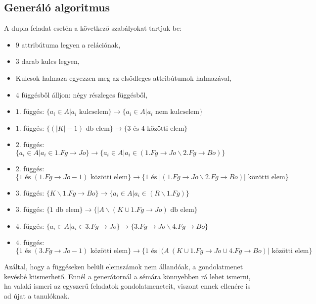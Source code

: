 \subsection{Generáló algoritmus}

A dupla feladat esetén a következő szabályokat tartjuk be:
\begin{itemize}
    \item $9$ attribútuma legyen a relációnak,
    \item $3$ darab kulcs legyen,
    \item Kulcsok halmaza egyezzen meg az elsődleges attribútumok halmazával,
    \item $4$ függésből álljon: négy részleges függésből,
    \item $1.$ függés: $\big\{ a_i \in A \big| a_i \text{ kulcselem}  \big\} \longrightarrow \big\{  a_i \in A \big| a_i \text{ nem kulcselem}  \big\}$ 
    \item $1.$ függés: $\big \{ (|K|-1) \text{ db elem} \big\} \longrightarrow \big\{ 3 \text{ és } 4 \text{ közötti elem} \big \}$
    \item $2.$ függés: $\big\{ a_i \in A \big| a_i \in 1.Fg \rightarrow Jo  \big\} \longrightarrow \big\{  a_i \in A \big| a_i \in (1.Fg \rightarrow Jo \backslash 2.Fg \rightarrow Bo)  \big\}$ 
    \item $2.$ függés: $\big \{ 1 \text{ és } (1.Fg\rightarrow Jo - 1) \text{ közötti elem} \big\} \longrightarrow \big\{ 1 \text { és } |(1.Fg \rightarrow Jo \backslash 2.Fg \rightarrow Bo)|  \text{ közötti elem} \big \}$
    \item $3.$ függés: $\big\{ K \backslash 1.Fg\rightarrow Bo \big\} \longrightarrow \big\{  a_i \in A \big| a_i \in (R \backslash 1.Fg)  \big\}$
    \item $3.$ függés: $\big \{ 1 \text{ db elem} \big\} \longrightarrow \big\{|A \backslash (K \cup 1.Fg \rightarrow Jo) \text{ db elem} \big \}$
    \item $4.$ függés: $\big\{ a_i \in A \big| a_i \in 3.Fg\rightarrow Jo \big\} \longrightarrow \big\{ 3.Fg\rightarrow Jo \backslash 4.Fg\rightarrow Bo\big\}$
    \item $4.$ függés: $\big \{ 1 \text{ és } (3.Fg\rightarrow Jo - 1) \text{ közötti elem} \big\} \longrightarrow \big\{ 1 \text { és } |(A \ (K \cup 1.Fg \rightarrow Jo \cup 4.Fg \rightarrow Bo)|  \text{ közötti elem} \big \}$
\end{itemize}

Azáltal, hogy a függéseken belüli elemszámok nem állandóak, a gondolatmenet kevésbé kiismerhető. Ennél a generátornál a sémára könnyebben rá lehet ismerni, ha valaki ismeri az egyszerű feladatok gondolatmeneteit, viszont ennek ellenére is ad újat a tanulóknak.

